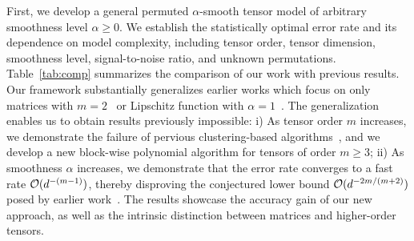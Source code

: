 \documentclass[12pt]{article}
\theoremstyle{definition}
\begin{document}
 \begin{table}[t]
    \centering
    \caption{Comparison of our results with previous work. $^*$For simplicity, we list here the error rate (omitting the log term) for $\infty$-smooth tensors. Our results allow general tensors of arbitrary smoothness level $\alpha\geq 0$; See Theorems~\ref{thm:LSE}-\ref{thm:BC} in Sections~\ref{sec:lse}-\ref{sec:borda}.}\label{tab:comp}
\end{table}

First, we develop a general permuted $\alpha$-smooth tensor model of arbitrary smoothness level $\alpha\geq 0$. We establish the statistically optimal error rate and its dependence on model complexity, including tensor order, tensor dimension, smoothness level, signal-to-noise ratio, and unknown permutations. Table~\ref{tab:comp} summarizes the comparison of our work with previous results.  Our framework substantially generalizes earlier works which focus on only matrices with $m=2$~\cite{gao2015rate,klopp2017oracle} or Lipschitz function with $\alpha=1$~\cite{balasubramanian2021nonparametric,li2019nearest}. The generalization enables us to obtain results previously impossible: i) As tensor order $m$ increases, we demonstrate the failure of pervious clustering-based algorithms~\cite{balasubramanian2021nonparametric,gao2015rate}, and we develop a new block-wise polynomial algorithm for tensors of order $m\geq 3$; ii) As smoothness $\alpha$ increases, we demonstrate that the error rate converges to a fast rate $\mathcal{O}(d^{-(m-1)})$, thereby disproving the conjectured lower bound $\mathcal{O}(d^{-2m/(m+2)})$ posed by earlier work~\cite{balasubramanian2021nonparametric}. The results showcase the accuracy gain of our new approach, as well as the intrinsic distinction between matrices and higher-order tensors. 
\end{document}
